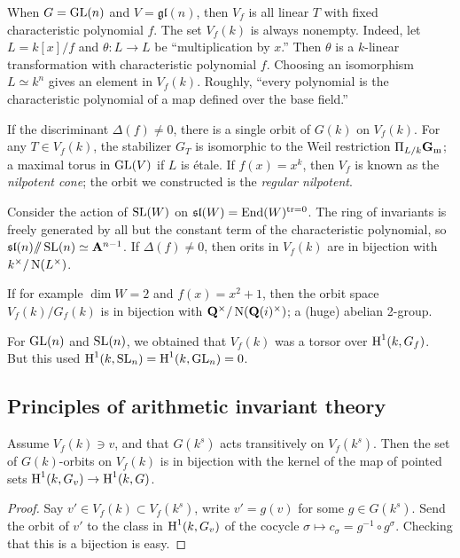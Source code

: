 \begin{example}
When $G=\operatorname{GL}(n)$ and $V=\mathfrak{gl}(n)$, then $V_f$ is all linear 
$T$ with fixed characteristic polynomial $f$. The set $V_f(k)$ is always 
nonempty. Indeed, let $L=k[x]/f$ and $\theta:L\to L$ be ``multiplication 
by $x$.'' Then $\theta$ is a $k$-linear transformation with characteristic 
polynomial $f$. Choosing an isomorphism $L\simeq k^n$ gives an element in 
$V_f(k)$. Roughly, ``every polynomial is the characteristic polynomial of a 
map defined over the base field.'' 

If the discriminant $\Delta(f)\ne 0$, there 
is a single orbit of $G(k)$ on $V_f(k)$. For any $T\in V_f(k)$, 
the stabilizer $G_T$ is isomorphic to the Weil restriction 
$\Pi_{L/k}\mathbf{G}_{\mathrm{m}}$; a maximal torus in $\operatorname{GL}(V)$ if $L$ 
is \'etale. 
If $f(x)=x^k$, then $V_f$ is known as the \emph{nilpotent cone}; the orbit 
we constructed is the \emph{regular nilpotent}. 
\end{example}

\begin{example}
Consider the action of $\operatorname{SL}(W)$ on 
$\mathfrak{sl}(W)=\operatorname{End}(W)^{\operatorname{tr}=0}$. The ring of invariants is freely 
generated by all but the constant term of the characteristic polynomial, so 
$\mathfrak{sl}(n)/\!\!/ \operatorname{SL}(n) \simeq \mathbf{A}^{n-1}$. If $\Delta(f)\ne 0$, 
then orits in $V_f(k)$ are in bijection with $k^\times / \operatorname{N}(L^\times)$. 

If for example $\dim W=2$ and $f(x)=x^2+1$, then the orbit space 
$V_f(k)/G_f(k)$ is in bijection with $\mathbf{Q}^\times/\operatorname{N}(\mathbf{Q}(i)^\times)$; a 
(huge) abelian 2-group. 
\end{example}

For $\operatorname{GL}(n)$ and $\operatorname{SL}(n)$, we obtained that 
$V_f(k)$ was a torsor over $\operatorname{H}^1(k,G_f)$. But this used 
$\operatorname{H}^1(k,\operatorname{SL}_n) = \operatorname{H}^1(k,\operatorname{GL}_n) = 0$. 





\subsection{Principles of arithmetic invariant theory}

\begin{principle}
Assume $V_f(k)\ni v$, and that $G(k^s)$ acts transitively on 
$V_f(k^s)$. Then the set of $G(k)$-orbits on $V_f(k)$ is in bijection with the 
kernel of the map of pointed sets 
$\operatorname{H}^1(k,G_v) \to \operatorname{H}^1(k,G)$. 
\end{principle}
\begin{proof}
Say $v'\in V_f(k)\subset V_f(k^s)$, write $v'=g(v)$ for some $g\in G(k^s)$. 
Send the orbit of $v'$ to the class in $\operatorname{H}^1(k,G_v)$ of the cocycle 
$\sigma\mapsto c_\sigma = g^{-1} \circ g^\sigma$. Checking that this is a 
bijection is easy. 
\end{proof}

